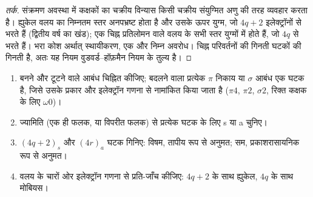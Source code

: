 \begin{proof}[तर्क]
संक्रमण अवस्था में कक्षकों का चक्रीय विन्यास किसी चक्रीय
संयुग्मित अणु की तरह व्यवहार करता है। ह्युकेल वलय का निम्नतम स्तर अनपभ्रष्ट होता है और उसके ऊपर
युग्म, जो $4q + 2$ इलेक्ट्रॉनों से भरते हैं (द्वितीय वर्ष का खंड); एक चिह्न
प्रतिलोमन वाले वलय के सभी स्तर युग्मों में होते हैं, जो $4q$ से भरते हैं। भरा कोश अर्थात्
स्थायीकरण, एक  और निम्न अवरोध। चिह्न
परिवर्तनों की गिनती  घटकों की गिनती है, अतः यह नियम
वुडवर्ड--हॉफ़मैन नियम के तुल्य है।
\end{proof}

\begin{method}[घटक बनाना और गिनना]\label{met:b3:pericyclic:components}
\begin{enumerate}
  \item बनने और टूटने वाले आबंध चिह्नित कीजिए; बदलने वाला प्रत्येक $\pi$ निकाय या $\sigma$ आबंध एक
        घटक है, जिसे उसके प्रकार और इलेक्ट्रॉन गणना से नामांकित किया जाता है ($\pi4$, $\pi2$, $\sigma2$, रिक्त कक्षक के लिए
        $\omega0$)।
  \item ज्यामिति (एक ही फलक, या
        विपरीत फलक) से प्रत्येक घटक के लिए s या a चुनिए।
  \item $(4q + 2)_s$ और $(4r)_a$ घटक गिनिए: विषम, तापीय रूप से अनुमत; सम,
        प्रकाशरासायनिक रूप से अनुमत।
  \item वलय के चारों ओर इलेक्ट्रॉन गणना से प्रति-जाँच कीजिए: $4q + 2$ के साथ ह्युकेल,
        $4q$ के साथ मोबियस।
\end{enumerate}
\end{method}

